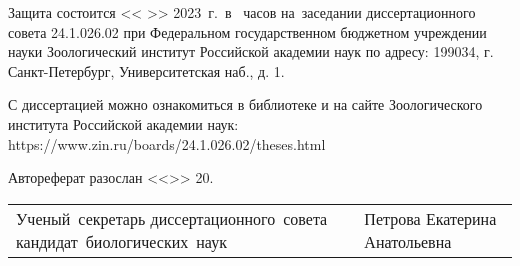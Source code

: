 \noindent Защита состоится <<  >>     2023~г.~в~   часов на~заседании диссертационного совета 24.1.026.02 при Федеральном государственном
бюджетном учреждении науки Зоологический институт Российской академии наук по адресу: 199034, г. Санкт-Петербург, Университетская наб., д. 1. 


\vspace{5mm}
\noindent С диссертацией можно ознакомиться в библиотеке и на сайте Зоологического института Российской академии наук: https://www.zin.ru/boards/24.1.026.02/theses.html

\vspace{5mm}
\noindent Автореферат разослан <<\hrf{2em}>> \hrf{6em} 20\hrf{2em}.

\vspace{5mm}
\begin{table}[h]
\begin{tabular}{b{.6\linewidth}b{.4\linewidth}}
\large \mbox{Ученый секретарь} \linebreak
\mbox{диссертационного совета} \linebreak
\mbox{кандидат биологических наук}
&  \large Петрова Екатерина Анатольевна \\
\end{tabular}
\end{table}


\newpage
